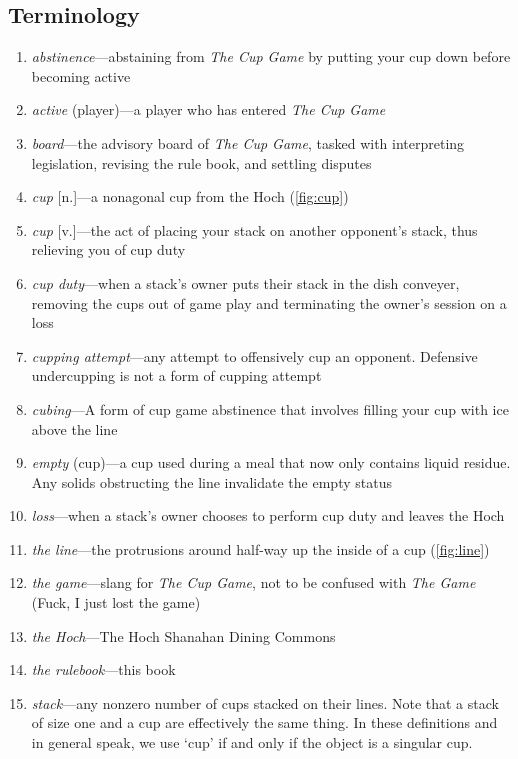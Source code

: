 \documentclass[12pt]{IEEEconf}
\begin{document}
\subsection{Terminology}\label{section:terminology}
\begin{enumerate}
    \item \textit{abstinence}---abstaining from \textit{The Cup Game} by putting your cup down before becoming active
    \item \textit{active} (player)---a player who has entered \textit{The Cup Game}
    \item \textit{board}---the advisory board of \textit{The Cup Game}, tasked with interpreting legislation, revising the rule book, and settling disputes
    \item \textit{cup} [n.]---a nonagonal cup from the Hoch (\ref{fig:cup})
    \item \textit{cup} [v.]---the act of placing your stack on another opponent's stack, thus relieving you of cup duty
    \item \textit{cup duty}---when a stack's owner puts their stack in the dish conveyer, removing the cups out of game play and terminating the owner's session on a loss
    \item \textit{cupping attempt}---any attempt to offensively cup an opponent. Defensive undercupping is not a form of cupping attempt
    \item \textit{cubing}---A form of cup game abstinence that involves filling your cup with ice above the line
    \item \textit{empty} (cup)---a cup used during a meal that now only contains liquid residue. Any solids obstructing the line invalidate the empty status
    \item \textit{loss}---when a stack's owner chooses to perform cup duty and leaves the Hoch
    \item \textit{the line}---the protrusions around half-way up the inside of a cup (\ref{fig:line})
    \item \textit{the game}---slang for \textit{The Cup Game}, not to be confused with \textit{The Game} (Fuck, I just lost the game)
    \item \textit{the Hoch}---The Hoch Shanahan Dining Commons
    \item \textit{the rulebook}---this book
    \item \textit{stack}---any nonzero number of cups stacked on their lines. Note that a stack of size one and a cup are effectively the same thing. In these definitions and in general speak, we use `cup' if and only if the object is a singular cup.

\end{enumerate}
\end{document}
